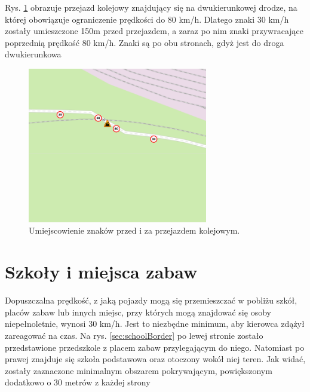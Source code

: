 Rys. \ref{sec:PrzejazdyKolejowe1} obrazuje przejazd kolejowy znajdujący się na dwukierunkowej drodze, na której obowiązuje ograniczenie prędkości do 80 km/h. Dlatego znaki 30 km/h zostały umieszczone 150m przed przejazdem, a zaraz po nim znaki przywracające poprzednią prędkość 80 km/h. Znaki są po obu stronach, gdyż jest do droga dwukierunkowa

\begin{figure}[h]
\caption{Umiejscowienie znaków przed i za przejazdem kolejowym.}
\label{sec:PrzejazdyKolejowe1}
\centering
\includegraphics[width=0.7\textwidth]{streetBeforeRail}
\end{figure}


\newpage
\section{Szkoły i miejsca zabaw}
\label{sec:schoolsMain}

Dopuszczalna prędkość, z jaką pojazdy mogą się przemieszczać w pobliżu szkół, placów zabaw lub innych miejsc, przy których mogą znajdować się osoby niepełnoletnie, wynosi 30 km/h. Jest to niezbędne minimum, aby kierowca zdążył zareagować na czas. Na rys. \ref{sec:schoolBorder} po lewej stronie zostało przedstawione przedszkole z placem zabaw przylegającym do niego. Natomiast po prawej znajduje się szkoła podstawowa oraz otoczony wokół niej teren. Jak widać, zostały zaznaczone minimalnym obszarem pokrywającym, powiększonym dodatkowo o 30 metrów z każdej strony

